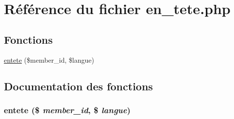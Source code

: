 \hypertarget{en__tete_8php}{
\section{R\'{e}f\'{e}rence du fichier en\_\-tete.php}
\label{en__tete_8php}
}
\subsection*{Fonctions}
\begin{CompactItemize}
\item 
\hyperlink{en__tete_8php_a0}{entete} (\$member\_\-id, \$langue)
\end{CompactItemize}


\subsection{Documentation des fonctions}
\hypertarget{en__tete_8php_a0}{
\subsubsection[entete]{\setlength{\rightskip}{0pt plus 5cm}entete (\$ {\em member\_\-id}, \$ {\em langue})}}
\label{en__tete_8php_a0}


